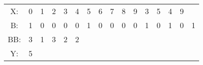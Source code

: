 \begin{tabular}{c|c|c|c|c|c|c|c|c|c|c|c|c|c|c|c|}
	\cline{2-15}
	X: & 0 & 1 & 2 & 3 & 4 & 5 & 6 & 7 & 8 & 9 & 3 & 5 & 4 & 9 \\
	\cline{2-16}
	B: & 1 & 0 & 0 & 0 & 0 & 1 & 0 & 0 & 0 & 0 & 1 & 0 & 1 & 0 & 1 \\
	\cline{2-16}
	BB: & 3 & 1 & 3 & 2 & 2 \\
	\cline{2-6}
	Y: & 5 \\
	\cline{2-2}
\end{tabular}

